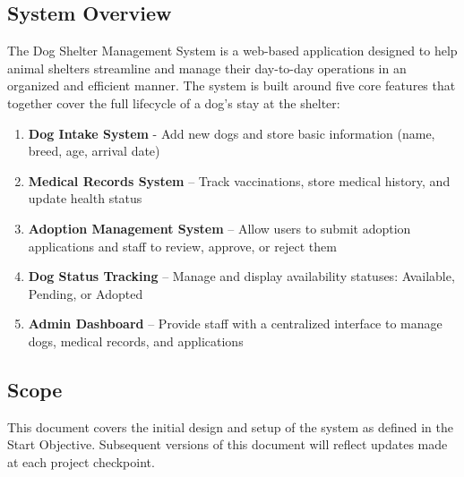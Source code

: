 \documentclass[12pt]{article}
\begin{document}
\subsection{System Overview}
The Dog Shelter Management System is a web-based application designed to help animal shelters streamline and manage their day-to-day operations in an organized and efficient manner. The system is built around five core features that together cover the full lifecycle of a dog's stay at the shelter:
 
\begin{enumerate}
    \item \textbf{Dog Intake System} - Add new dogs and store basic information (name, breed, age, arrival date)
    \item \textbf{Medical Records System} -- Track vaccinations, store medical history, and update health status
    \item \textbf{Adoption Management System} -- Allow users to submit adoption applications and staff to review, approve, or reject them
    \item \textbf{Dog Status Tracking} -- Manage and display availability statuses: Available, Pending, or Adopted
    \item \textbf{Admin Dashboard} -- Provide staff with a centralized interface to manage dogs, medical records, and applications
\end{enumerate}
 
\subsection{Scope}
This document covers the initial design and setup of the system as defined in the Start Objective.
Subsequent versions of this document will reflect updates made at each project checkpoint.
\end{document}

